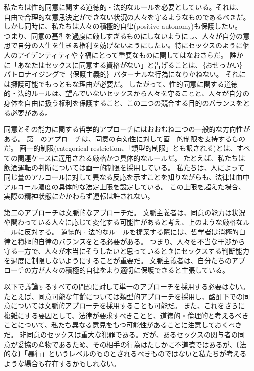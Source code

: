 \documentclass[paper=a4,book,openany]{jlreq}
\begin{document}
私たちは性的同意に関する道徳的・法的なルールを必要としている。それは、
自由で合理的な意思決定ができない状況の人々を守るようなものであるべきだ。
しかし同時に、私たちは人々の積極的自律(positive autonomy)も保護したい。
つまり、同意の基準を過度に厳しすぎるものにしないようにし、人々が自分の意思で自分の人生を生きる権利を妨げないようにしたい。特にセックスのように個人のアイデンティティや幸福にとって重要なものに関してはなおさらだ。
誰かに「あなたはセックスに同意する資格がない」と告げることは、｛おせっかい｝{パトロナイジング}で｛保護主義的｝{パターナル}な行為になりかねない。
それには擁護可能でもっともな理由が必要だ。
したがって、性的同意に関する道徳的・法的ルールは、望んでいないセックスから人々を守ることと、人々が自分の身体を自由に扱う権利を保護すること、この二つの競合する目的のバランスをとる必要がある。

同意とその能力に関する哲学的アプローチにはおおむね二つの一般的な方向性がある。
第一のアプローチは、同意の有効性に対して画一的制限を支持するものだ。
画一的制限(categorical restriction、「類型的制限」とも訳される)とは、すべての関連ケースに適用される厳格かつ具体的なルールだ。
たとえば、私たちは飲酒運転の判断については画一的制限を採用している。
私たちは、人によって同じ量のアルコールに対して異なる反応を示すことを知りながらも、法律は血中アルコール濃度の具体的な法定上限を設定している。
この上限を超えた場合、実際の精神状態にかかわらず運転は許されない。

第二のアプローチは文脈的なアプローチだ。
文脈主義者は、同意の能力は状況や関わっている人々に応じて変化する可能性があると考え、上のような厳格なルールに反対する。
道徳的・法的なルールを提案する際には、哲学者は消極的自律と積極的自律のバランスをとる必要がある。
つまり、人々を不当な干渉から守る一方で、人々が本当にそうしたいと思っているときにセックスする判断能力を過度に制限しないようにすることが重要だ。
文脈主義者は、自分たちのアプローチの方が人々の積極的自律をより適切に保護できると主張している。

以下で議論するすべての問題に対して単一のアプローチを採用する必要はない。
たとえば、同意可能な年齢については類型的アプローチを採用し、酩酊下での同意については文脈的アプローチを採用することも可能だ。
また、これをさらに複雑にする要因として、法律が要求すべきことと、道徳的・倫理的と考えるべきことについて、私たち異なる意見をもつ可能性があることに注意しておくべきだ。
非同意のセックスは重大な犯罪である。だが、あるセックスの関与者の同意が妥協の産物であるため、その相手の行為はたしかに不道徳ではあるが、〔法的な〕「暴行」というレベルのものとされるべきものではないと私たちが考えるような場合も存在するかもしれない。
\end{document}
